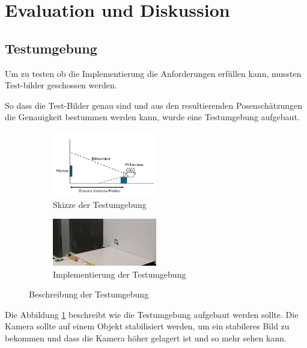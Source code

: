 \section{Evaluation und Diskussion}

\subsection{Testumgebung}

Um zu testen ob die Implementierung die Anforderungen erfüllen kann, mussten Test-bilder geschossen werden.

So dass die Test-Bilder genau sind und aus den resultierenden Posenschätzungen die Genauigkeit bestummen werden kann, wurde eine Testumgebung aufgebaut.

\begin{figure}[H]
    \centering
    \begin{subfigure}[h]{0.5\textwidth}
        \includegraphics[width=0.5\textwidth]{graphics/Skizze_TestUmgebung.PNG}\hfill%
        \caption{Skizze der Testumgebung}
        \label{fig:SkizzeTestumgebung}
    \end{subfigure}
    \quad
    \begin{subfigure}[h]{0.5\textwidth}
        \includegraphics[width=0.5\textwidth]{graphics/TestUmgebung.jpg}\hfill%
        \caption{Implementierung der Testumgebung}
        \label{fig:Testumgebung}
    \end{subfigure}
    \caption{Beschreibung der Testumgebung}
\end{figure}

Die Abbildung \ref{fig:SkizzeTestumgebung} beschreibt wie die Testumgebung aufgebaut werden sollte.
Die Kamera sollte auf einem Objekt stabilisiert werden, um ein stabileres Bild zu bekommen und dass die Kamera höher gelagert ist und so mehr sehen kann.

